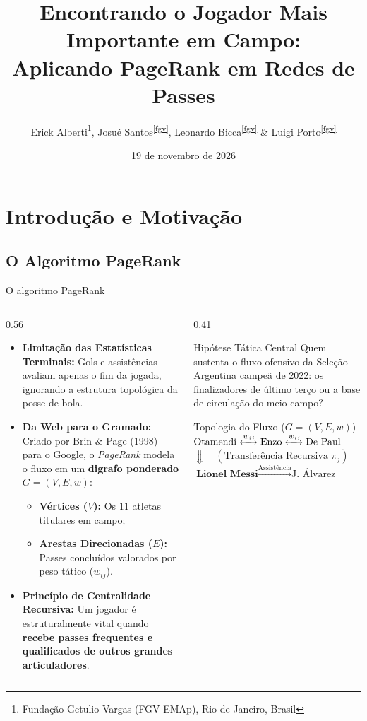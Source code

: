 \documentclass[aspectratio=1610,10pt]{beamer}
\title{Encontrando o Jogador Mais Importante em Campo:\\Aplicando PageRank em Redes de Passes}
\author[E. Alberti, J. Santos, L. Bicca \& L. Porto]{%
        Erick Alberti\footnote{\label{fgv}Fundação Getulio Vargas (FGV EMAp), Rio de Janeiro, Brasil},
        Josué Santos\textsuperscript{\ref{fgv}},
        Leonardo Bicca\textsuperscript{\ref{fgv}} \&
        Luigi Porto\textsuperscript{\ref{fgv}}}
\institute{Apresentado por: Erick Alberti, Josué Santos, Leonardo Bicca e Luigi Porto}
\date{19 de novembro de 2026}
\begin{document}
\begin{frame}[plain]
  \titlepage
\end{frame}

\section{Introdução e Motivação}
\subsection{O Algoritmo PageRank}
\begin{frame}{O algoritmo PageRank}
  \begin{columns}[T,onlytextwidth]
    \begin{column}{0.56\textwidth}
      \footnotesize
      \begin{itemize}
        \setlength{\itemsep}{6pt}
        \item \textbf{Limitação das Estatísticas Terminais:} Gols e assistências avaliam apenas o fim da jogada, ignorando a estrutura topológica da posse de bola.
        \item \textbf{Da Web para o Gramado:} Criado por Brin \& Page (1998) para o Google, o \textit{PageRank} modela o fluxo em um \textbf{digrafo ponderado} $G=(V, E, w)$:
        \begin{itemize}
          \footnotesize
          \item \textbf{Vértices ($V$):} Os $11$ atletas titulares em campo;
          \item \textbf{Arestas Direcionadas ($E$):} Passes concluídos valorados por peso tático ($w_{ij}$).
        \end{itemize}
        \item \textbf{Princípio de Centralidade Recursiva:} Um jogador é estruturalmente vital quando \textbf{recebe passes frequentes e qualificados de outros grandes articuladores}.
      \end{itemize}
    \end{column}
    \begin{column}{0.41\textwidth}
      \begin{block}{Hipótese Tática Central}
        Quem sustenta o fluxo ofensivo da Seleção Argentina campeã de 2022: os finalizadores de último terço ou a base de circulação do meio-campo?
      \end{block}
      \begin{block}{Topologia do Fluxo ($G = (V, E, w)$)}
        \centering
        $\text{Otamendi} \xleftrightarrow{w_{ij}} \text{Enzo} \xleftrightarrow{w_{ij}} \text{De Paul}$\\[0.12cm]
        $\Downarrow \quad (\text{Transferência Recursiva }\pi_j)$\\[0.12cm]
        $\textbf{Lionel Messi} \xrightarrow{\text{Assistência}} \text{J. Álvarez}$
      \end{block}
    \end{column}
  \end{columns}
\end{frame}
\end{document}
